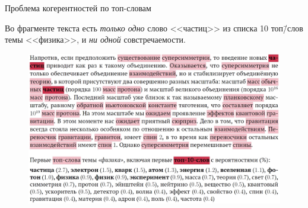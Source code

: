 \documentclass[sans, mathsans, russian]{beamer}
\begin{document}
%    


\begin{frame}{Проблема когерентностей по топ-словам}
  \begin{block}{}
    Во фрагменте текста есть \emph{только одно} слово <<частиц>> из списка 10 топ\=/слов темы <<физика>>, и \emph{ни одной} совстречаемости.
  \end{block}
  
  \begin{figure}[h]
    \centering
    \includegraphics[width=1.0\textwidth]{topwords-insufficient.jpg}
  \end{figure}
\end{frame}
\end{document}
